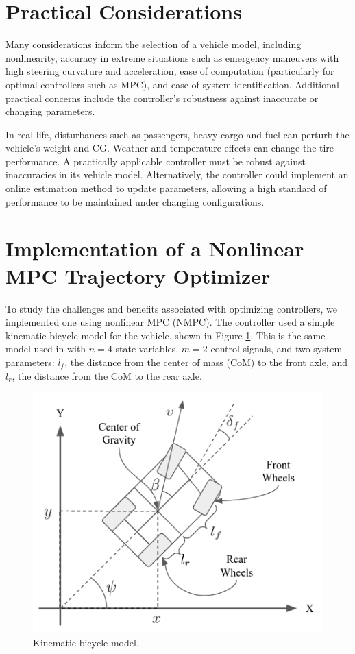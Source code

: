 \documentclass[conference]{IEEEtran}
\begin{document}
\section{Practical Considerations}

Many considerations inform the selection of a vehicle model, including nonlinearity, accuracy in extreme situations such as emergency maneuvers with high steering curvature and acceleration, ease of computation (particularly for optimal controllers such as MPC), and ease of system identification. Additional practical concerns include the controller's robustness against inaccurate or changing parameters.

In real life, disturbances such as passengers, heavy cargo and fuel can perturb the vehicle's weight and CG. Weather and temperature effects can change the tire performance. A practically applicable controller must be robust against inaccuracies in its vehicle  model. Alternatively, the controller could implement an online estimation method to update parameters, allowing a high standard of performance to be maintained under changing configurations.

\section{Implementation of a Nonlinear MPC Trajectory Optimizer}

To study the challenges and benefits associated with optimizing controllers, we implemented one using nonlinear MPC (NMPC). The controller used a simple kinematic bicycle model for the vehicle, shown in Figure \ref{fig:kinematic}. This is the same model used in \cite{farag} with $n=4$ state variables, $m=2$ control signals, and two system parameters: $l_f$, the distance from the center of mass (CoM) to the front axle, and $l_r$, the distance from the CoM to the rear axle.

\begin{figure}[htbp]
	\centering
	\includegraphics[width=0.8\linewidth]{kinematic_diagram.png}
	\caption{Kinematic bicycle model.}
	\label{fig:kinematic}
\end{figure}
\end{document}
